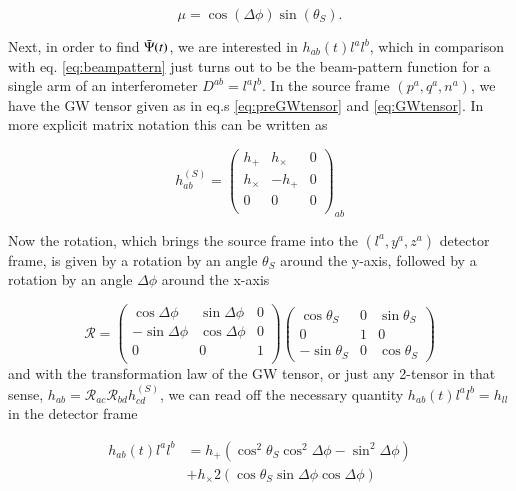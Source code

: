 \documentclass{aa}
\begin{document}
\begin{equation}
    \mu = \cos (\Delta \phi) \sin (\theta_S).
\end{equation}

Next, in order to find $\Bar{\Psi}(t)$, we are interested in $h_{ab}(t)l^al^b$, which in comparison with eq. \ref{eq:beampattern} just turns out to be the beam-pattern function for a single arm of an interferometer $D^{ab}=l^al^b$. In the source frame $(p^a,q^a,n^a)$, we have the GW tensor given as in eq.s \ref{eq:preGWtensor} and \ref{eq:GWtensor}. In more explicit matrix notation this can be written as

\begin{equation}
    h_{ab}^{(S)} = 
    \begin{pmatrix}
    h_+ & h_\times & 0 \\
    h_\times & -h_+ & 0 \\
    0 & 0 & 0 \\
    \end{pmatrix}_{ab}
\end{equation}

Now the rotation, which brings the source frame into the $(l^a,y^a,z^a)$ detector frame, is given by a rotation by an angle $\theta_S$ around the y-axis, followed by a rotation by an angle $\Delta \phi$ around the x-axis

\begin{equation}
    \mathcal{R} = \begin{pmatrix}
\cos \Delta \phi & \sin \Delta \phi & 0 \\
-\sin \Delta \phi & \cos \Delta \phi & 0 \\
0 & 0 & 1 \\
\end{pmatrix}
\begin{pmatrix}
\cos \theta_S & 0 & \sin \theta_S\\
0 & 1 & 0 \\
-\sin \theta_S & 0 & \cos \theta_S
\end{pmatrix}
\end{equation}
and with the transformation law of the GW tensor, or just any 2-tensor in that sense, $h_{ab}=\mathcal{R}_{ac}\mathcal{R}_{bd}h_{cd}^{(S)}$, we can read off the necessary quantity $h_{ab}(t)l^al^b=h_{ll}$ in the detector frame

\begin{equation}
\begin{split}
    h_{ab}(t)l^al^b &= h_+(\cos^2 \theta_S \cos^2 \Delta \phi-\sin^2 \Delta \phi) \\ &+ h_\times 2(\cos \theta_S \sin \Delta \phi \cos \Delta \phi)
\end{split}
\end{equation}
\end{document}
